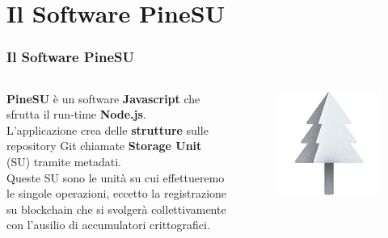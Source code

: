 \documentclass{beamer}
\begin{document}
\section{Il Software PineSU}
\begin{frame}
	\frametitle{Il Software PineSU}
	\begin{columns}
		\textbf{PineSU} è un software \textbf{Javascript} che sfrutta il run-time \textbf{Node.js}. \\
		\smallskip
		L'applicazione crea delle \textbf{strutture} sulle repository Git chiamate
		\textbf{Storage Unit} (SU) tramite metadati. \\
		\smallskip
		Queste SU sono le unità su cui effettueremo le singole
		operazioni, eccetto la registrazione su blockchain che si svolgerà
		collettivamente con l'ausilio di accumulatori crittografici. 
		\centering
		\begin{figure}
			\includegraphics[width=\textwidth]{figures/favicon.png}
		\end{figure} 
	\end{columns}
\end{frame}
\end{document}
